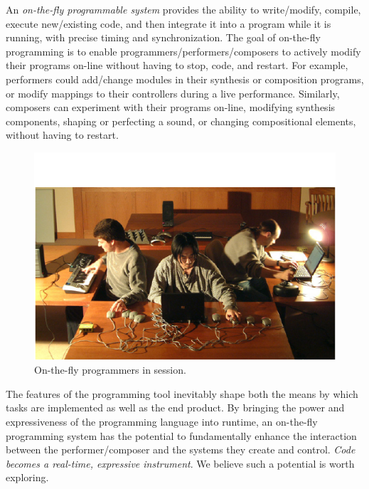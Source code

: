 An \textit{on-the-fly programmable system} provides the ability to write/modify,
compile, execute new/existing code, and then integrate it into a program while it
is running, with precise timing and synchronization.  The goal of on-the-fly
programming is to enable programmers/performers/composers to actively modify
their programs on-line without having to stop, code, and restart.  For example,
performers could add/change modules in their synthesis or composition programs,
or modify mappings to their controllers during a live performance.  Similarly,
composers can experiment with their programs on-line, modifying synthesis
components, shaping or perfecting a sound, or changing compositional elements,
without having to restart.

\begin{figure}[t]
\centering
\includegraphics[width=\textwidth]{img-1-eps-converted-to-crop.pdf}
\caption{On-the-fly programmers in session.}
\label{Wang:img-1}
\end{figure}

The features of the programming tool inevitably shape both the means by which tasks are implemented as well as the end product.  By bringing the power and expressiveness of the programming language into runtime, an on-the-fly programming system has the potential to fundamentally enhance the interaction between the performer/composer and the systems they create and control. \textit{Code becomes a real-time, expressive instrument}.  We believe such a potential is worth exploring.

